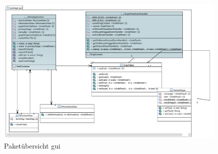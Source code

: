 \begin{figure}[hb]
  \centering
  \includegraphics[width=380pt]{resourcen/gui.pdf}
  \caption{Paketübersicht gui}
  \label{fig:packge_gui}
\end{figure}

